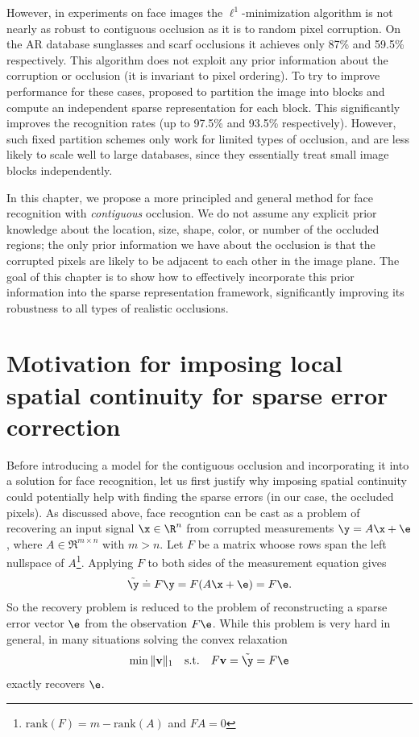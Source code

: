 However, in experiments on face images the $\ell^1$-minimization algorithm is not nearly as robust to contiguous occlusion as it is to random pixel corruption.  On the AR database sunglasses and scarf occlusions it achieves only 87\% and 59.5\% respectively.  This algorithm does not exploit any prior information about the corruption or occlusion (it is invariant to pixel ordering).  To try to improve performance for these cases, \cite{Wright2009-PAMI} proposed to partition the image into blocks and compute an independent sparse representation for each block. This significantly improves the recognition rates (up to 97.5\% and 93.5\% respectively). However, such fixed partition schemes only work for limited types of occlusion, and are less likely to scale well to large databases, since they essentially treat small image blocks independently.

In this chapter, we propose a more principled and general method for face recognition with {\em contiguous} occlusion. We do not assume any explicit prior knowledge about the location, size, shape, color, or number of the occluded regions; the only prior information we have about the occlusion is that the corrupted pixels are likely to be adjacent to each other in the image plane. The goal of this chapter is to show how to effectively incorporate this prior information into the sparse representation framework, significantly improving its robustness to all types of realistic occlusions.

\section{Motivation for imposing local spatial continuity for sparse error correction}
Before introducing a model for the contiguous occlusion and incorporating it into a solution for face recognition, let us first justify why imposing spatial continuity could potentially help with finding the sparse errors (in our case, the occluded pixels). As discussed above, face recogntion can be cast as a problem of recovering an input signal $\x\in \R^n$ from corrupted measurements $\y = A\x+\e$, where $A\in
\Re^{m\times n}$ with $m>n$. Let $F$ be a matrix whoose rows span the left nullspace of
$A$\footnote{$\mathrm{rank}(F) = m - \mathrm{rank}(A)$ and $FA=0$}. Applying $F$ to both sides of the measurement equation gives \vspace{0mm}
\begin{displaymath}
\tilde{\y} \doteq F \y = F(A \x+ \e) = F\e. \vspace{0mm}
\end{displaymath}
So the recovery problem is reduced to the problem of reconstructing
a sparse error vector $\e$ from the observation $F \e$. While this problem is very hard in general, in many situations solving the convex relaxation \vspace{0mm}
\begin{equation*}
\min \| \mathbf{v} \|_1 \quad \textup{s.t.} \quad F \mathbf{v} = \tilde{\y} = F \e \vspace{0mm}
\end{equation*}
exactly recovers $\e$.


